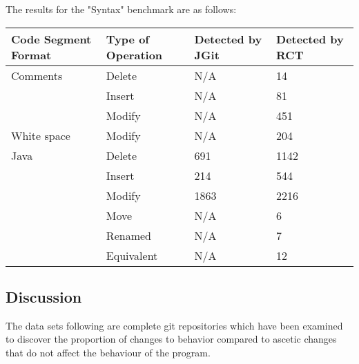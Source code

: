 The results for the "Syntax" benchmark are as follows:

\begin{table}[H]
    \begin{tabular}{llll}
    Code Segment Format & Type of Operation & Detected by JGit & Detected by RCT \\ \hline
    Comments               & Delete            & N/A              & 14                                   \\
    ~                      & Insert            & N/A              & 81                                   \\
    ~                      & Modify            & N/A              & 451                                  \\
    White space            & Modify            & N/A              & 204                                  \\
    Java                   & Delete            & 691              & 1142                                 \\
    ~                      & Insert            & 214              & 544                                  \\
    ~                      & Modify            & 1863             & 2216                                 \\
    ~                      & Move              & N/A              & 6                                    \\
    ~                      & Renamed           & N/A              & 7                                    \\
    ~                      & Equivalent        & N/A              & 12                                   \\
    \end{tabular}
\end{table}
\subsection{Discussion}

The data sets following are complete git repositories which have been examined to discover the proportion of changes to behavior compared to ascetic changes that do not affect the behaviour of the program. 

% 
% 

